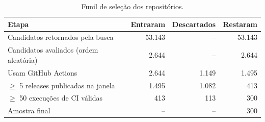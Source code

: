 \begin{table}[ht]
\centering
\caption{Funil de seleção dos repositórios.}
\label{tab:funil}
\begin{tabular}{lrrr}
\hline
Etapa & Entraram & Descartados & Restaram \\
\hline
Candidatos retornados pela busca & 53.143 & -- & 53.143 \\
Candidatos avaliados (ordem aleatória) & 2.644 & -- & 2.644 \\
Usam GitHub Actions & 2.644 & 1.149 & 1.495 \\
$\geq$ 5 releases publicadas na janela & 1.495 & 1.082 & 413 \\
$\geq$ 50 execuções de CI válidas & 413 & 113 & 300 \\
Amostra final & -- & -- & 300 \\
\hline
\end{tabular}
\end{table}

